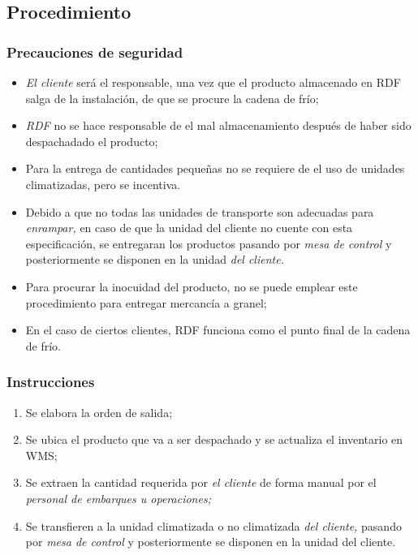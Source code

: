 \subsection{Procedimiento}

\subsubsection{Precauciones de seguridad}
\begin{itemize}
	\item \emph{El cliente} será el responsable, una vez que el producto almacenado en RDF salga de la instalación, de que se procure la cadena de frío;
	\item \emph{RDF} no se hace responsable de el mal almacenamiento después de haber sido despachadado el producto;
	\item Para la entrega de cantidades pequeñas no se requiere de el uso de unidades climatizadas, pero se incentiva.
	\item Debido a que no todas las unidades de transporte son adecuadas para \emph{enrampar,} en caso de que la unidad del cliente no cuente con esta especificación, se entregaran los productos pasando por \emph{mesa de control} y posteriormente se disponen en la unidad  \emph{del cliente.}
	\item Para procurar la inocuidad del producto, no se puede emplear este procedimiento para entregar mercancía a granel;
	\item En el caso de ciertos clientes, RDF funciona como el punto final de la cadena de frío.
\end{itemize}

\subsubsection{Instrucciones}
\begin{enumerate}
	\item Se elabora la orden de salida;
	\item Se ubica el producto que va a ser despachado y se actualiza el inventario en WMS;
	\item Se extraen la cantidad requerida por \emph{el cliente} de forma manual por el \emph{personal de embarques u operaciones;}
	\item Se transfieren a la unidad climatizada o no climatizada \emph{del cliente,} pasando por \emph{mesa de control} y posteriormente se disponen en la unidad del cliente.
\end{enumerate}

